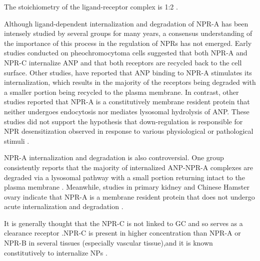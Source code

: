 \documentclass[14pt,a4paper,onecolumn]{extarticle}
\begin{document}


The stoichiometry of the ligand-receptor complex is 1:2 \citep{177}. %


Although ligand-dependent internalization and degradation of NPR-A has been intensely studied by several groups for many years, a consensus understanding of the importance of this process in the regulation of NPRs has not emerged. Early studies conducted on pheochromocytoma cells suggested that both NPR-A and NPR-C internalize ANP and that both receptors are recycled back to the cell surface. Other studies, have reported that ANP binding to NPR-A stimulates its internalization, which results in the majority of the receptors being degraded with a smaller portion being recycled to the plasma membrane. In contrast, other studies reported that NPR-A is a constitutively membrane resident protein that neither undergoes endocytosis nor mediates lysosomal hydrolysis of ANP.  These studies did not support the hypothesis that down-regulation is responsible for NPR desensitization observed in response to various physiological or pathological stimuli \citep{182}.

NPR-A internalization and degradation is also controversial. One group consistently reports that the majority of internalized ANP-NPR-A complexes are degraded via a lysosomal pathway with a small portion returning intact to the plasma membrane \citep{Pandey2002}. Meanwhile, studies in primary kidney and Chinese Hamster ovary indicate that NPR-A is a membrane resident protein that does not undergo acute internalization and degradation \citep{Fan2005} \citep{Vieira2001}. %

It is generally thought that the NPR-C is not linked to GC and so serves as a clearance receptor \citep{28} \citep{77} \citep{bib33}.NPR-C is present in higher concentration than NPR-A or NPR-B in several tissues (especially vascular tissue),and it is known constitutively to internalize NPs \citep{172}.
\end{document}

